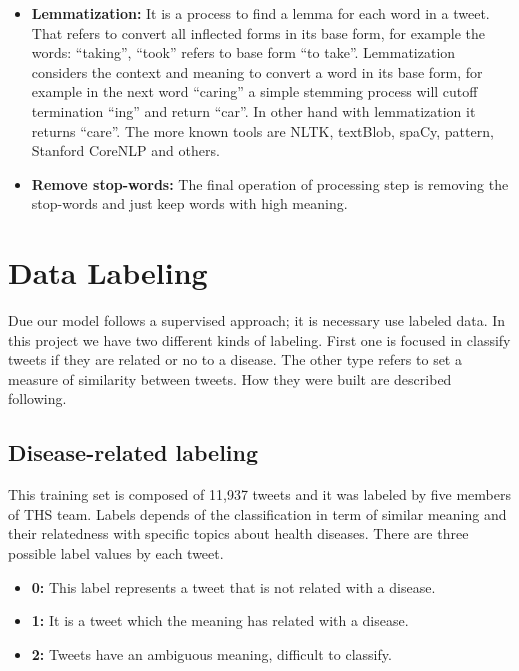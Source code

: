 \documentclass[12pt]{report}
\begin{document}
\begin{itemize}[nolistsep]
	\item \textbf{Lemmatization:} It is a process to find a lemma for each word in a tweet. That refers to convert all inflected forms in its base form, for example the words: “taking”, “took” refers to base form “to take”. Lemmatization considers the context and meaning to convert a word in its base form, for example in the next word “caring” a simple stemming process will cutoff termination “ing” and return “car”. In other hand with lemmatization it returns “care”. The more known tools are \ac{NLTK}, textBlob, spaCy, pattern, Stanford CoreNLP and others. 

	\item \textbf{Remove stop-words:} The final operation of processing step is removing the stop-words and just keep words with high meaning.
\end{itemize}

\section{Data Labeling} \label{data_labeling}

Due our model follows a supervised approach; it is necessary use labeled data. In this project we have two different kinds of labeling. First one is focused in classify tweets if they are related or no to a disease. The other type refers to set a measure of similarity between tweets. How they were built are described following.

\subsection{Disease-related labeling}

This training set is composed of 11,937 tweets and it was labeled by five members of \ac{THS} team. Labels depends of the classification in term of similar meaning and their relatedness with specific topics about health diseases. There are three possible label values by each tweet. 

\begin{itemize} [nolistsep]
	\item \textbf{0:} This label represents a tweet that is not related with a disease. 
	\item \textbf{1:} It is a tweet which the meaning has related with a disease.
	\item \textbf{2:} Tweets have an ambiguous meaning, difficult to classify.
\end{itemize}
\end{document}
